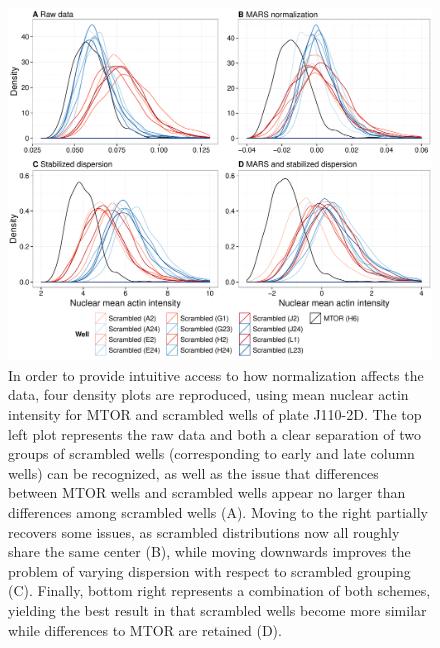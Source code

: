 \begin{knitrout}
\color{fgcolor}\begin{figure}

{\centering \includegraphics[width=\maxwidth]{figures/R/normalization-data-actin-normalization-1} 

}

\caption[Effects of normalization schemes visualized through density plots.]{In order to provide intuitive access to how normalization affects the data, four density plots are reproduced, using mean nuclear actin intensity for MTOR and scrambled wells of plate J110-2D. The top left plot represents the raw data and both a clear separation of two groups of scrambled wells (corresponding to early and late column wells) can be recognized, as well as the issue that differences between MTOR wells and scrambled wells appear no larger than differences among scrambled wells (A). Moving to the right partially recovers some issues, as scrambled distributions now all roughly share the same center (B), while moving downwards improves the problem of varying dispersion with respect to scrambled grouping (C). Finally, bottom right represents a combination of both schemes, yielding the best result in that scrambled wells become more similar while differences to MTOR are retained (D).}\label{fig:data-actin-normalization}
\end{figure}


\end{knitrout}
